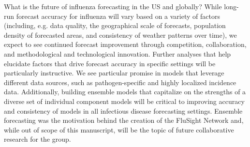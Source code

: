 \documentclass[9pt,twocolumn,twoside]{pnas-new}\usepackage[]{graphicx}\usepackage[]{color}
\begin{document}

What is the future of influenza forecasting in the US and globally? %
While long-run forecast accuracy for influenza will vary based on a variety of factors (including, e.g. data quality, the geographical scale of forecasts, population density of forecasted areas, and consistency of weather patterns over time\cite{dalziel2018urbanization}), we expect to see continued forecast improvement through competition, collaboration, and methodological and technological innovation.
Further analyses that help elucidate factors that drive forecast accuracy in specific settings will be particularly instructive. 
We see particular promise in models that leverage different data sources, such as pathogen-specific and highly localized incidence data.
Additionally, building ensemble models that capitalize on the strengths of a diverse set of individual component models will be critical to improving accuracy and consistency of models in all infectious disease forecasting settings. 
Ensemble forecasting was the motivation behind the creation of the FluSight Network and, while out of scope of this manuscript, will be the topic of future collaborative research for the group.
\end{document}
